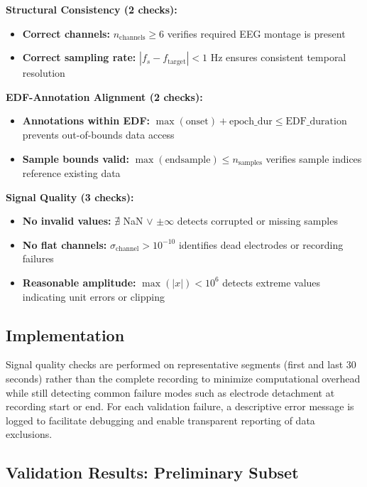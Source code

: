 \documentclass{imc-inf} %
\begin{document}
\textbf{Structural Consistency (2 checks):}
\begin{itemize}
\item \textbf{Correct channels:} $n_{\text{channels}} \geq 6$ verifies required EEG montage is present
\item \textbf{Correct sampling rate:} $|f_s - f_{\text{target}}| < 1\text{ Hz}$ ensures consistent temporal resolution
\end{itemize}

\textbf{EDF-Annotation Alignment (2 checks):}
\begin{itemize}
\item \textbf{Annotations within EDF:} $\max(\text{onset}) + \text{epoch\_dur} \leq \text{EDF\_duration}$ prevents out-of-bounds data access
\item \textbf{Sample bounds valid:} $\max(\text{endsample}) \leq n_{\text{samples}}$ verifies sample indices reference existing data
\end{itemize}

\textbf{Signal Quality (3 checks):}
\begin{itemize}
\item \textbf{No invalid values:} $\nexists$ NaN $\vee$ $\pm\infty$ detects corrupted or missing samples
\item \textbf{No flat channels:} $\sigma_{\text{channel}} > 10^{-10}$ identifies dead electrodes or recording failures
\item \textbf{Reasonable amplitude:} $\max(|x|) < 10^6$ detects extreme values indicating unit errors or clipping
\end{itemize}

\subsection{Implementation}

Signal quality checks are performed on representative segments (first and last 30 seconds) rather than the complete recording to minimize computational overhead while still detecting common failure modes such as electrode detachment at recording start or end. For each validation failure, a descriptive error message is logged to facilitate debugging and enable transparent reporting of data exclusions.

\subsection{Validation Results: Preliminary Subset}
\end{document}

